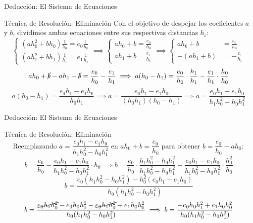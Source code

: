 \documentclass[aspectratio=169, t]{beamer}
\begin{document}
\begin{frame}{Deducción: El Sistema de Ecuaciones}
    \vspace{-0.2cm}
    \begin{concept}{Técnica de Resolución: Eliminación}
        Con el objetivo de despejar los coeficientes $a$ y $b$, dividimos ambas ecuaciones entre sus respectivas distancias $h_i$:
        \[
        \begin{cases} 
        (a h_0^2 + b h_0)\frac{1}{h_0} = e_0 \frac{1}{h_0} \\ 
        (a h_1^2 + b h_1) \frac{1}{h_1} = e_1 \frac{1}{h_1}
        \end{cases} 
        \implies
        \begin{cases} 
        a h_0 + b = \frac{e_0}{h_0} \\ 
        a h_1 + b = \frac{e_1}{h_1}
        \end{cases}
        \implies
        \left\{
        \begin{aligned} 
            a h_0 + b &= \frac{e_0}{h_0} \\ 
            -(a h_1 + b) &= - \frac{e_1}{h_1}
        \end{aligned}
        \right.
        \]
        \[
        a h_0 + \cancel{b} - a h_1 - \cancel{b} = \frac{e_0}{h_0} - \frac{e_1}{h_1} \implies a (h_0 - h_1) = \frac{e_0}{h_0} \cdot \frac{h_1}{h_1} - \frac{e_1}{h_1} \cdot \frac{h_0}{h_0}
        \]
        \[
        a (h_0 - h_1) = \frac{e_0h_1 - e_1h_0}{h_0h_1} \implies a = \frac{e_0h_1 - e_1h_0}{(h_0h_1)(h_0 - h_1)} \implies \boxed{a = \frac{e_0h_1 - e_1h_0}{h_1h_0^2 - h_0h_1^2}}
        \]
    \end{concept}
\end{frame}

\begin{frame}{Deducción: El Sistema de Ecuaciones}
    \begin{mathstep}{Técnica de Resolución: Eliminación}
        \[
        \text{Reemplazando } a = \frac{e_0h_1 - e_1h_0}{h_1h_0^2 - h_0h_1^2} \text{ en }
        ah_0 + b = \frac{e_0}{h_0} \text{ para obtener } b = \frac{e_0}{h_0} - ah_0:        \]
        \[
         b = \frac{e_0}{h_0} - \frac{e_0h_1 - e_1h_0}{h_1h_0^2 - h_0h_1^2}\cdot h_0 \implies b = \frac{e_0}{h_0} \cdot \frac{h_1h_0^2 - h_0h_1^2}{h_1h_0^2 - h_0h_1^2} - \frac{e_0h_1 - e_1h_0}{h_1h_0^2 - h_0h_1^2} \cdot \frac{h_0^2}{h_0}
        \]
        \[
        b = \frac{e_0(h_1h_0^2 - h_0h_1^2) - h_0^2(e_0h_1 - e_1h_0)}{h_0(h_1h_0^2 - h_0h_1^2)}
        \]
        \[
        b = \frac{\cancel{e_0h_1h_0^2} - e_0h_0h_1^2 - \cancel{e_0h_1h_0^2} + e_1h_0h_0^2}{h_0(h_1h_0^2 - h_0h_1^2)} \implies b = \frac{ - e_0h_0h_1^2 + e_1h_0h_0^2}{h_0(h_1h_0^2 - h_0h_1^2)}
        \]
    \end{mathstep}
\end{frame}
\end{document}
